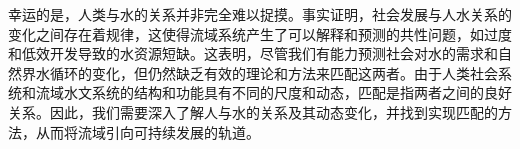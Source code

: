 幸运的是，人类与水的关系并非完全难以捉摸。事实证明，社会发展与人水关系的变化之间存在着规律，这使得流域系统产生了可以解释和预测的共性问题，如过度和低效开发导致的水资源短缺。这表明，尽管我们有能力预测社会对水的需求和自然界水循环的变化，但仍然缺乏有效的理论和方法来匹配这两者。由于人类社会系统和流域水文系统的结构和功能具有不同的尺度和动态，匹配是指两者之间的良好关系。因此，我们需要深入了解人与水的关系及其动态变化，并找到实现匹配的方法，从而将流域引向可持续发展的轨道。
